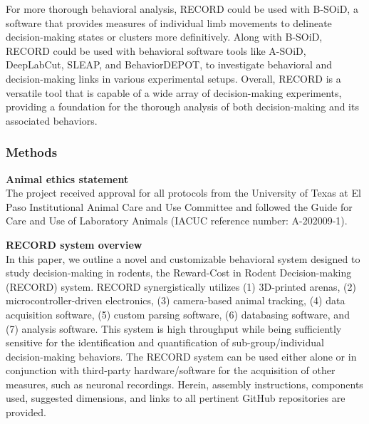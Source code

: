 \documentclass{article}
\begin{document}
For more thorough behavioral analysis, RECORD could be used with B-SOiD, a software that provides measures of individual limb movements to delineate decision-making states or clusters more definitively\cite{hsu2021b}. Along with B-SOiD, RECORD could be used with behavioral software tools like A-SOiD\cite{tillmann2024soid}, DeepLabCut\cite{mathis2018deeplabcut, nath2019using, monsees2022estimation, lauer2022multi}, SLEAP\cite{pereira2022sleap}, and BehaviorDEPOT\cite{gabriel2022behaviordepot}, to investigate behavioral and decision-making links in various experimental setups. Overall, RECORD is a versatile tool that is capable of a wide array of decision-making experiments, providing a foundation for the thorough analysis of both decision-making and its associated behaviors.

\clearpage

\subsubsection{Methods}
\noindent\textbf{Animal ethics statement}\\
The project received approval for all protocols from the University of Texas at El Paso Institutional Animal Care and Use Committee and followed the Guide for Care and Use of Laboratory Animals (IACUC reference number: A-202009-1).

\vspace{1em}

\noindent\textbf{RECORD system overview}\\
In this paper, we outline a novel and customizable behavioral system designed to study decision-making in rodents, the Reward-Cost in Rodent Decision-making (RECORD) system. RECORD synergistically utilizes (1) 3D-printed arenas, (2) microcontroller-driven electronics, (3) camera-based animal tracking, (4) data acquisition software, (5) custom parsing software, (6) databasing software, and (7) analysis software. This system is high throughput while being sufficiently sensitive for the identification and quantification of sub-group/individual decision-making behaviors. The RECORD system can be used either alone or in conjunction with third-party hardware/software for the acquisition of other measures, such as neuronal recordings. Herein, assembly instructions, components used, suggested dimensions, and links to all pertinent GitHub repositories are provided.

\vspace{1em}
\end{document}
